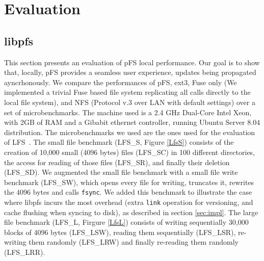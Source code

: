 
\section{Evaluation}
\label{sec:eval}


\subsection{libpfs}

This section presents an evaluation of pFS local performance. Our goal
is to show that, locally, pFS provides a seamless user experience,
updates being propagated ayncrhonously. We compare the performances of
pFS, ext3, Fuse only (We implemented a trivial Fuse based file system
replicating all calls directly to the local file system), and NFS
(Protocol v.3 over LAN with default settings) over a set of
microbenchmarks. The machine used is a 2.4 GHz Dual-Core Intel Xeon,
with 2GB of RAM and a Gibabit ethernet controller, running Ubuntu
Server 8.04 distribution. The microbenchmarks we used are the ones
used for the evaluation of LFS~\cite{rosenblum:lfs}. The small file
benchmark (LFS\_S, Figure \ref{LfsS}) consists of the creation of
10,000 small (4096 bytes) files (LFS\_SC) in 100 different
directories, the access for reading of those files (LFS\_SR), and
finally their deletion (LFS\_SD). We augmented the small file
benchmark with a small file write benchmark (LFS\_SW), which opens
every file for writing, truncates it, rewrites the 4096 bytes and
calls {\tt fsync}.  We added this benchmark to illustrate the case
where libpfs incurs the most overhead (extra {\tt link} operation
for versioning, and cache flushing when syncing to disk), as
described in section \ref{sec:impl}. The large file benchmark (LFS\_L,
Firgure \ref{LfsL}) consists of writing sequentially 30,000 blocks of
4096 bytes (LFS\_LSW), reading them sequentially (LFS\_LSR),
re-writing them randomly (LFS\_LRW) and finally re-reading them
randomly (LFS\_LRR).

